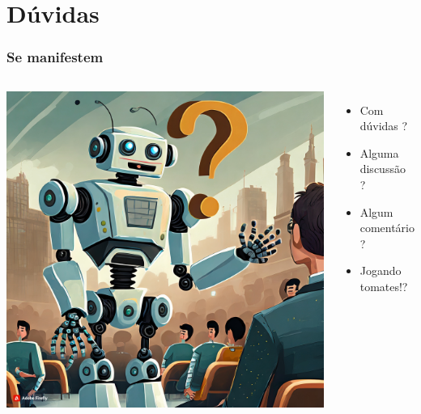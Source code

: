 \documentclass{beamer}
\begin{document}
\section{Dúvidas}
\begin{frame}
   \frametitle{Se manifestem}
   \begin{columns}
	   \begin{flushright}
	   \includegraphics[width=.80\textwidth]{imagens/robo_duvida}
	   \end{flushright}
		   \begin{itemize}
		   \item Com dúvidas ?
		   \item Alguma discussão ?
		   \item Algum comentário ?
		   \item Jogando tomates!?
		   \end{itemize}
	\end{columns}
\end{frame}
\end{document}

